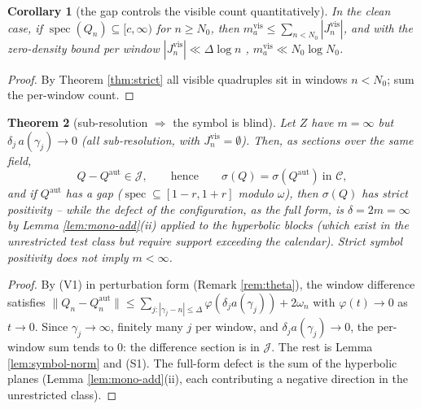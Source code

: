 \documentclass[11pt,reqno]{amsart}
\newtheorem{theorem}{Theorem}[section]
\newtheorem{corollary}[theorem]{Corollary}
\theoremstyle{definition}
\newcommand{\Jc}{\mathcal{J}}
\newcommand{\Cor}{\mathcal{C}}
\newcommand{\spec}{\operatorname{spec}}
\newcommand{\Qaut}{Q^{\mathrm{aut}}}
\begin{document}
\begin{corollary}[the gap controls the visible count quantitatively]
\label{cor:gap-quant}
In the clean case, if \(\spec(Q_n)\subseteq[c,\infty)\) for \(n\geq N_0\), then
\(m_a^{\mathrm{vis}}\leq\sum_{n<N_0}|J_n^{\mathrm{vis}}|\), and with the
zero-density bound per window \(|J_n^{\mathrm{vis}}|\ll\Delta\log n\)
\cite[Thm.\ 5.8]{IwaniecKowalski}, \(m_a^{\mathrm{vis}}\ll N_0\log N_0\).
\end{corollary}

\begin{proof}
By Theorem \ref{thm:strict} all visible quadruples sit in windows \(n<N_0\); sum
the per-window count.
\end{proof}

\begin{theorem}[sub-resolution \(\Rightarrow\) the symbol is blind]
\label{thm:blind}
Let \(Z\) have \(m=\infty\) but \(\delta_j\,a(\gamma_j)\to0\) (all
sub-resolution, with \(J_n^{\mathrm{vis}}=\emptyset\)). Then, as sections over
the same field,
\[
Q-\Qaut\in\Jc,\qquad\text{hence}\qquad\sigma(Q)=\sigma(\Qaut)\ \text{in }\Cor,
\]
and if \(\Qaut\) has a gap (\(\spec\subseteq[1-r,1+r]\) modulo \(\omega\)), then
\(\sigma(Q)\) has \emph{strict} positivity -- while the defect of the
configuration, as the full form, is \(\delta=2m=\infty\) by Lemma
\ref{lem:mono-add}\textup{(ii)} applied to the hyperbolic blocks
\textup{(}which exist in the unrestricted test class but require support
exceeding the calendar\textup{)}. Strict symbol positivity does \emph{not} imply
\(m<\infty\).
\end{theorem}

\begin{proof}
By (V1) in perturbation form (Remark \ref{rem:theta}), the window difference
satisfies
\(\|Q_n-\Qaut_n\|\leq\sum_{j:|\gamma_j-n|\leq\Delta}\varphi(\delta_j a(\gamma_j))
+2\omega_n\) with \(\varphi(t)\to0\) as \(t\to0\). Since \(\gamma_j\to\infty\),
finitely many \(j\) per window, and \(\delta_j a(\gamma_j)\to0\), the per-window
sum tends to \(0\): the difference section is in \(\Jc\). The rest is Lemma
\ref{lem:symbol-norm} and (S1). The full-form defect is the sum of the
hyperbolic planes (Lemma \ref{lem:mono-add}(ii), each contributing a negative
direction in the unrestricted class).
\end{proof}
\end{document}
